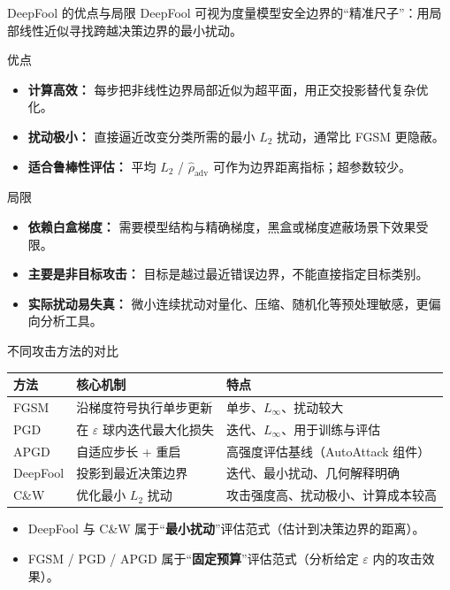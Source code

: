 \documentclass[aspectratio=169,11pt]{beamer}
\begin{document}
\begin{frame}{DeepFool 的优点与局限}
  \footnotesize
  DeepFool 可视为度量模型安全边界的“精准尺子”：用局部线性近似寻找跨越决策边界的最小扰动。
  \vspace{0.25em}

  \begin{block}{优点}
    \begin{itemize}
      \item \textbf{计算高效：} 每步把非线性边界局部近似为超平面，用正交投影替代复杂优化。
      \item \textbf{扰动极小：} 直接逼近改变分类所需的最小 $L_2$ 扰动，通常比 FGSM 更隐蔽。
      \item \textbf{适合鲁棒性评估：} 平均 $L_2$ / $\hat\rho_{\mathrm{adv}}$ 可作为边界距离指标；超参数较少。
    \end{itemize}
  \end{block}

  \vspace{0.35em}

  \begin{block}{局限}
    \begin{itemize}
      \item \textbf{依赖白盒梯度：} 需要模型结构与精确梯度，黑盒或梯度遮蔽场景下效果受限。
      \item \textbf{主要是非目标攻击：} 目标是越过最近错误边界，不能直接指定目标类别。
      \item \textbf{实际扰动易失真：} 微小连续扰动对量化、压缩、随机化等预处理敏感，更偏向分析工具。
    \end{itemize}
  \end{block}
\end{frame}

\begin{frame}{不同攻击方法的对比}
  \begin{table}
  \centering
  \footnotesize
  \begin{tabular}{lll}
    \toprule
    方法 & 核心机制 & 特点 \\
    \midrule
    FGSM     & 沿梯度符号执行单步更新     & 单步、$L_\infty$、扰动较大 \\
    PGD      & 在 $\varepsilon$ 球内迭代最大化损失 & 迭代、$L_\infty$、用于训练与评估 \\
    APGD     & 自适应步长 + 重启     & 高强度评估基线（AutoAttack 组件） \\
    \alert{DeepFool} & \alert{投影到最近决策边界} & \alert{迭代、最小扰动、几何解释明确} \\
    C\&W     & 优化最小 $L_2$ 扰动   & 攻击强度高、扰动极小、计算成本较高 \\
    \bottomrule
  \end{tabular}
  \end{table}
  \vspace{0.5em}
  \begin{itemize}
    \item DeepFool 与 C\&W 属于“\textbf{最小扰动}”评估范式（估计到决策边界的距离）。
    \item FGSM / PGD / APGD 属于“\textbf{固定预算}”评估范式（分析给定 $\varepsilon$ 内的攻击效果）。
  \end{itemize}
\end{frame}
\end{document}
